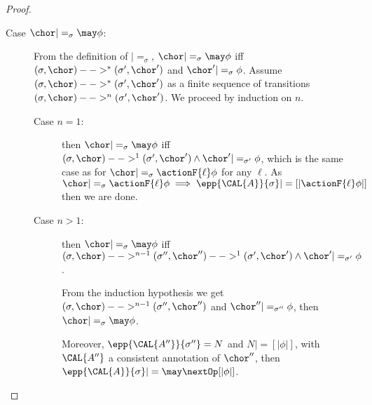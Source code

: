 \begin{proof}
\begin{description}



\item[Case $\chor |=_\sigma \may \phi$:]

  From  the definition of $|=_\sigma$, $\chor
  |=_\sigma \may \phi$ iff $(\sigma, \chor) -->^* (\sigma', \chor')$ and
  $\chor' |=_\sigma \phi$. Assume $(\sigma, \chor) -->^* (\sigma', \chor')$
  as a finite sequence of transitions $(\sigma, \chor) -->^n
  (\sigma', \chor')$. We proceed by induction on $n$.

  \begin{description}
   \item[Case $n=1$:] then $\chor |=_\sigma \may \phi$ iff $(\sigma, \chor) -->^1
  (\sigma', \chor') \land \chor' |=_{\sigma'} \phi$, which is the same case as
  for $\chor |=_\sigma \actionF{\ell} \phi$ for any $\ell$. As $\chor
  |=_\sigma \actionF{\ell} \phi \implies \epp{\CAL{A}}{\sigma} |=
  [| \actionF{\ell} \phi |]$ then we are done.

   \item[Case $n>1$:] then $\chor |=_\sigma \may \phi$ iff $(\sigma, \chor)
  -->^{n-1} (\sigma'', \chor'') --> ^1 (\sigma',\chor') \land \chor' |=_{\sigma'}
  \phi$.

  From the induction hypothesis we get $(\sigma, \chor)
  -->^{n-1} (\sigma'', \chor'')$ and $\chor ''|=_{\sigma''} \phi$, then $\chor
  |=_\sigma \may \phi$. 

  Moreover, $\epp{\CAL{A''}}{\sigma''} =N$
  and $N |= [| \phi |]$, with $\CAL{A''}$ a consistent annotation of
  $\chor''$, then $\epp{\CAL{A}}{\sigma} |= \may \nextOp [| \phi |]$.


\end{description}
\end{description}
\end{proof}
